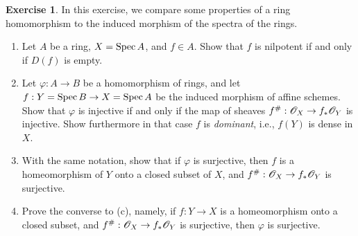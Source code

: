 \documentclass[]{pcmi}
\theoremstyle{plain}
\theoremstyle{definition}
\newtheorem{Exercise}{Exercise}
\theoremstyle{remark}
\begin{document}
\begin{Exercise}
    In this exercise, we compare some properties of a ring homomorphism to the induced morphism of the spectra of the rings. 
    \begin{enumerate}[label = (\alph*)]
        \item  Let $A$ be a ring, $X = \operatorname{Spec} A$, and $f \in A$. Show that $f$ is nilpotent if and only if $D(f)$ is empty. 
        \item Let $\varphi : A \to B$ be a homomorphism of rings, and let $f : Y = \operatorname{Spec} B \to X = \operatorname{Spec} A$ be the induced morphism of affine schemes. Show that $\varphi$ is injective if and only if the map of sheaves $f^\# : \mathscr{O}_X \to f_* \mathscr{O}_Y$ is injective. Show furthermore in that case $f$ is \emph{dominant}, i.e., $f(Y)$ is dense in $X$. 
        \item With the same notation, show that if $\varphi$ is surjective, then $f$ is a homeomorphism of $Y$ onto a closed subset of $X$, and $f^{\#} : \mathscr{O}_X \to f_* \mathscr{O}_Y$ is surjective. 
        \item Prove the converse to (c), namely, if $f : Y \to X$ is a homeomorphism onto a closed subset, and $f^{\#} : \mathscr{O}_X \to f_* \mathscr{O}_Y$ is surjective, then $\varphi$ is surjective. 
    \end{enumerate}
\end{Exercise}
\end{document}
